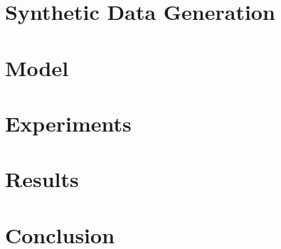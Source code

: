 \documentclass{article}
\theoremstyle{plain}
\theoremstyle{definition}
\theoremstyle{remark}
\begin{document}
\section{Synthetic Data Generation}          
\label{synthetic-data}

\section{Model}           
\label{model}

\section{Experiments}           
\label{experiments}

\section{Results}           
\label{results}

\section{Conclusion}           
\label{conclusion}

\end{document}
